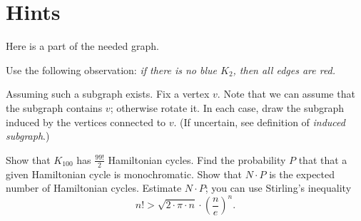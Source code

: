 \backmatter

\chapter{Hints}


\raggedcolumns\setlength{\multicolsep}{10mm}

\setcounter{eqtn}{0}

Here is a part of the needed graph.

\begin{center}
\end{center}

\setcounter{eqtn}{0}

Use the following observation:
\textit{if there is no blue $K_2$, then all edges are red.}

Assuming such a subgraph exists.
Fix a vertex $v$.
Note that we can assume that the subgraph contains $v$; otherwise rotate it.
In each case, draw the subgraph induced by the vertices connected to $v$.
(If uncertain, see definition of \textit{induced subgraph}.)

\setcounter{eqtn}{0}

Show that $K_{100}$ has $\tfrac{99!}2$ Hamiltonian cycles.
Find the probability $P$ that that a given Hamiltonian cycle is monochromatic.
Show that $N\cdot P$ is the expected number of Hamiltonian cycles.
Estimate $N\cdot P$; you can use
Stirling's inequality
\[n!>\sqrt{2\cdot \pi\cdot n}\cdot \left(\frac{n}{e}\right)^n.\]

